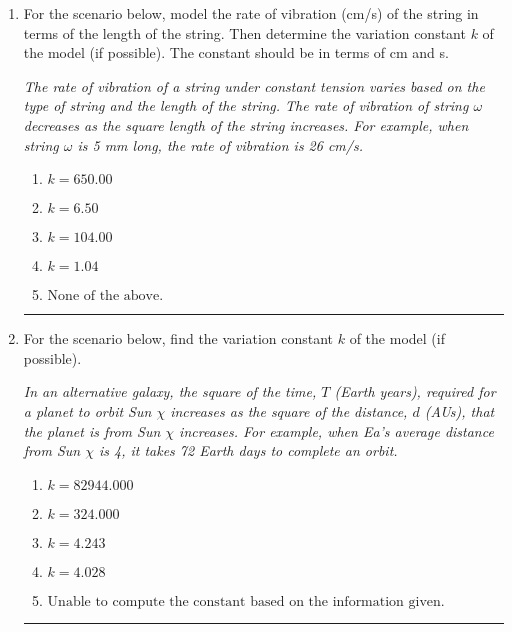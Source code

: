 \documentclass[14pt]{extbook}
\newcommand{\litem}[1]{\item#1\hspace*{-1cm}\rule{\textwidth}{0.4pt}}
\begin{document}
\begin{enumerate}
{\begin{enumerate}[label=\Alph*.]
\end{enumerate} }
\litem{
For the scenario below, model the rate of vibration (cm/s) of the string in terms of the length of the string. Then determine the variation constant $k$ of the model (if possible). The constant should be in terms of cm and s.
\begin{center}
    \textit{ The rate of vibration of a string under constant tension varies based on the type of string and the length of the string. The rate of vibration of string $\omega$ decreases as the square length of the string increases. For example, when string $\omega$ is 5 mm long, the rate of vibration is 26 cm/s. }
\end{center}
\begin{enumerate}[label=\Alph*.]
\item \( k = 650.00 \)
\item \( k = 6.50 \)
\item \( k = 104.00 \)
\item \( k = 1.04 \)
\item \( \text{None of the above.} \)

\end{enumerate} }
\litem{
For the scenario below, find the variation constant $k$ of the model (if possible).
\begin{center}
    \textit{ In an alternative galaxy, the square of the time, $T$ (Earth years), required for a planet to orbit Sun $\chi$ increases as the square of the distance, $d$ (AUs), that the planet is from Sun $\chi$ increases. For example, when Ea's average distance from Sun $\chi$ is 4, it takes 72 Earth days to complete an orbit. }
\end{center}
\begin{enumerate}[label=\Alph*.]
\item \( k = 82944.000 \)
\item \( k = 324.000 \)
\item \( k = 4.243 \)
\item \( k = 4.028 \)
\item \( \text{Unable to compute the constant based on the information given.} \)


\end{enumerate}}
\end{enumerate}
\end{document}
